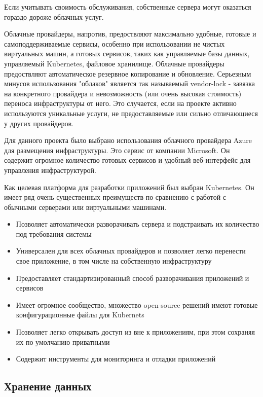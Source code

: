Если учитывать своимость обслуживания, собственные сервера могут оказаться гораздо дороже облачных услуг.

Облачные провайдеры, напротив, предоствляют максимально удобные, готовые и самоподдерживаемые сервисы, особенно при использовании не чистых виртуальных машин, а готовых сервисов, таких как управляемые базы данных, управляемый Kubernetes, файловое хранилище. Облачные провайдеры предоствляют автоматическое резервное копирование и обновление. Серьезным минусов использования "облаков" является так называемый vendor-lock - завязка на конкретного провайдера и невозможность (или очень высокая стоимость) переноса инфраструктуры от него. Это случается, если на проекте активно используются уникальные услуги, не предоставляемые или сильно отличающиеся у других провайдеров.

Для данного проекта было выбрано использования облачного провайдера Azure для размещения инфраструктуры. Это сервис от компании Microsoft. Он содержит огромное количество готовых сервисов и удобный веб-интерфейс для управления инфраструктурой.

Как целевая платформа для разработки приложений был выбран Kubernetes. Он имеет ряд очень существенных преимуществ по сравнению с работой с обычными серверами или виртуальными машинами.

\begin{itemize}
	\item Позволяет автоматически разворачивать сервера и подстраивать их количество под требования системы
	\item Универсален для всех облачных провайдеров и позволяет легко перенести свое приложение, в том числе на собственную инфраструктуру
	\item Предоставляет стандартизированный способ разворачивания приложений и сервисов
	\item Имеет огромное сообщество, множество open-source решений имеют готовые конфигурационные файлы для Kubernets
	\item Позволяет легко открывать доступ из вне к приложениям, при этом сохраняя их по умолчанию приватными
	\item Содержит инструменты для мониторинга и отладки приложений
\end{itemize}

\subsection{Хранение данных}

